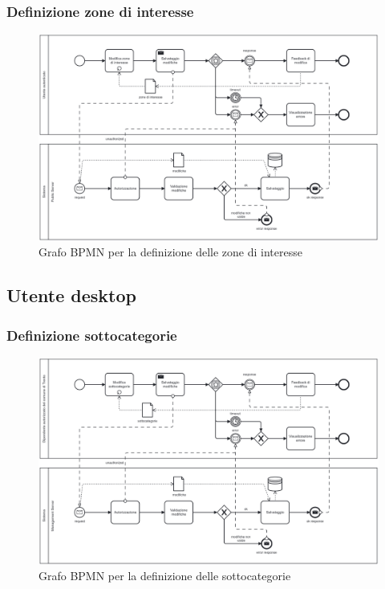 \documentclass{article}
\begin{document}
\clearpage

\subsubsection{Definizione zone di interesse}

\begin{figure}[htbp]
    \label{7.1.6}
    \centering
    \includegraphics[width=1\textwidth]{Images/BPMN - zone.png}
    \caption{Grafo BPMN per la definizione delle zone di interesse}
\end{figure}
\clearpage

\subsection{Utente desktop}

\subsubsection{Definizione sottocategorie}

\begin{figure}[htbp]
    \label{7.2.1}
    \centering
    \includegraphics[width=1\textwidth]{Images/BPMN - sottocategorie.png}
    \caption{Grafo BPMN per la definizione delle sottocategorie}
\end{figure}
\clearpage
\end{document}

